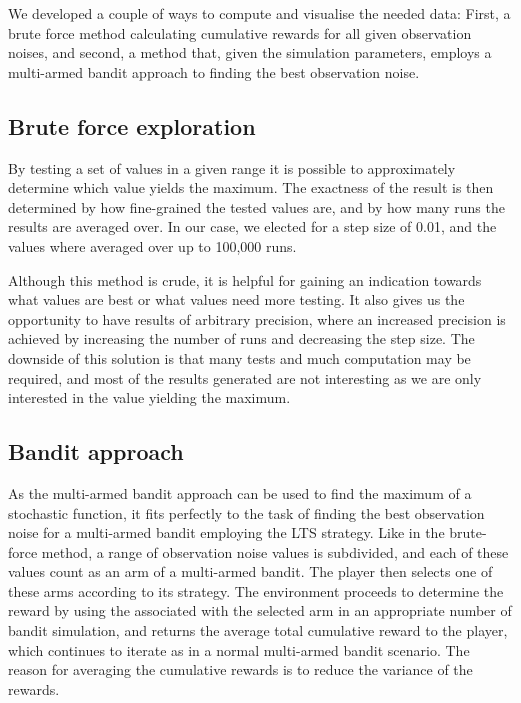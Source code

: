 We developed a couple of ways to compute and visualise the needed data:
First, a brute force method calculating cumulative rewards for all given observation noises, and second, a method that, given the simulation parameters, employs a multi-armed bandit approach to finding the best observation noise.

\subsection{Brute force exploration}
By testing a set of values in a given range it is possible to approximately determine which value yields the maximum.
The exactness of the result is then determined by how fine-grained the tested values are, and by how many runs the results are averaged over.
In our case, we elected for a step size of 0.01, and the values where averaged over up to 100,000 runs.

Although this method is crude, it is helpful for gaining an indication towards what values are best or what values need more testing.
It also gives us the opportunity to have results of arbitrary precision, where an increased precision is achieved by increasing the number of runs and decreasing the step size.
The downside of this solution is that many tests and much computation may be required, and most of the results generated are not interesting as we are only interested in the value yielding the maximum.

\subsection{Bandit approach}
As the multi-armed bandit approach can be used to find the maximum of a stochastic function, it fits perfectly to the task of finding the best observation noise for a multi-armed bandit employing the LTS strategy.
Like in the brute-force method, a range of observation noise values is subdivided, and each of these values count as an arm of a multi-armed bandit.
The player then selects one of these arms according to its strategy.
The environment proceeds to determine the reward by using the \ob{} associated with the selected arm in an appropriate number of bandit simulation, and returns the average total cumulative reward to the player, which continues to iterate as in a normal multi-armed bandit scenario.
The reason for averaging the cumulative rewards is to reduce the variance of the rewards.

